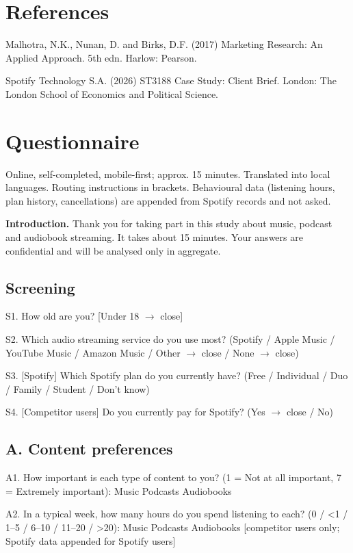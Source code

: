 \documentclass[11pt,a4paper]{article}
\begin{document}
\section{References}
Malhotra, N.K., Nunan, D. and Birks, D.F. (2017) Marketing Research: An Applied Approach. 5th edn. Harlow: Pearson.

Spotify Technology S.A. (2026) ST3188 Case Study: Client Brief. London: The London School of Economics and Political Science.

\clearpage
\appendix
\section{Questionnaire}
Online, self-completed, mobile-first; approx. 15 minutes. Translated into local languages. Routing instructions in brackets. Behavioural data (listening hours, plan history, cancellations) are appended from Spotify records and not asked.

\textbf{Introduction.} Thank you for taking part in this study about music, podcast and audiobook streaming. It takes about 15 minutes. Your answers are confidential and will be analysed only in aggregate.

\subsection*{Screening}
S1. How old are you? [Under 18 \(\rightarrow\) close]

S2. Which audio streaming service do you use most? (Spotify / Apple Music / YouTube Music / Amazon Music / Other \(\rightarrow\) close / None \(\rightarrow\) close)

S3. [Spotify] Which Spotify plan do you currently have? (Free / Individual / Duo / Family / Student / Don't know)

S4. [Competitor users] Do you currently pay for Spotify? (Yes \(\rightarrow\) close / No)

\subsection*{A. Content preferences}
A1. How important is each type of content to you? (1 = Not at all important, 7 = Extremely important): Music \textperiodcentered{} Podcasts \textperiodcentered{} Audiobooks

A2. In a typical week, how many hours do you spend listening to each? (0 / <1 / 1–5 / 6–10 / 11–20 / >20): Music \textperiodcentered{} Podcasts \textperiodcentered{} Audiobooks [competitor users only; Spotify data appended for Spotify users]
\end{document}
